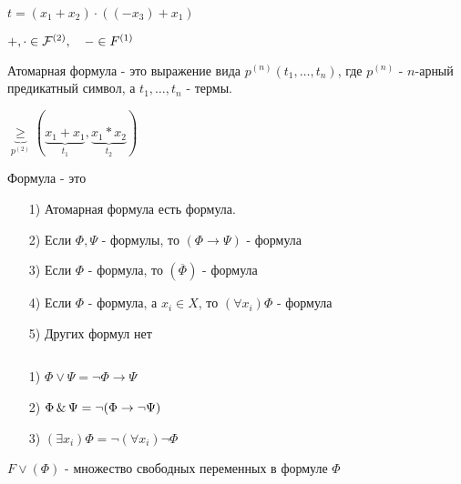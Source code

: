 \medskip

$t = (x_1 + x_2)\cdot ((-x_3) + x_1)$

$+, \cdot \in {\cal F}^{(2)},\quad - \in F^{(1)}$


\begin{definition}
Атомарная формула - это выражение вида $p^{(n)}(t_1,\ldots,t_n)$, где $p^{(n)}$ - $n$-арный
предикатный символ, а $t_1,\ldots,t_n$ - термы.
\end{definition}

$ \underbrace{\ge}_{p^{(2)}} ( \underbrace{x_1 + x_1}_{t_1}, \underbrace{x_1*x_2}_{t_2})$ 

\begin{definition}
    Формула - это
\begin{itemize}
    \item[1)] Атомарная формула есть формула.
    \item[2)] Если $\Phi, \Psi$ - формулы, то  $(\Phi \to \Psi)$ - формула
    \item[3)] Если $\Phi$ - формула, то  $(\overline{\Phi})$ - формула
    \item[4)] Если $\Phi$ - формула, а  $x_i \in X$, то $(\forall x_{i})\Phi$ - формула
    \item[5)] Других формул нет
\end{itemize}
\end{definition}


\begin{definition} ${}$\newline
\begin{itemize}
    \item[1)] $\Phi \lor \Psi = \lnot \Phi \to \Psi$
    \item[2)] $\Phi\operatorname{\&}\Psi = \lnot(\Phi \to \lnot\Psi)$
    \item[3)] $(\exists x_{i})\Phi = \lnot(\forall x_{i})\lnot\Phi$
\end{itemize}

\end{definition}

\medskip

$F \lor (\Phi)$ - множество свободных переменных в формуле $\Phi$



